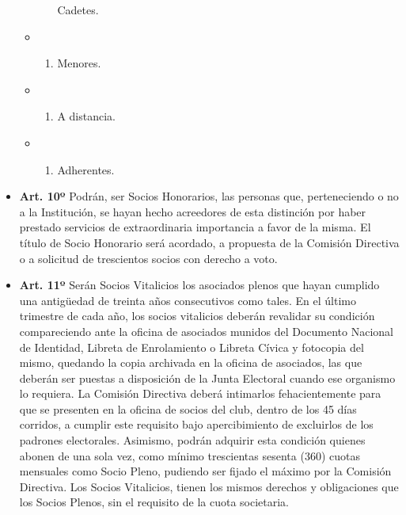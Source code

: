 \documentclass[]{book}
\providecommand{\tightlist}{%
  \setlength{\itemsep}{0pt}\setlength{\parskip}{0pt}}
\begin{document}
\begin{itemize}
\begin{itemize}
\begin{enumerate}
      Cadetes.
    \end{enumerate}
  \item
    \begin{enumerate}
    \def\labelenumi{\alph{enumi})}
    \setcounter{enumi}{6}
    \tightlist
    \item
      Menores.
    \end{enumerate}
  \item
    \begin{enumerate}
    \def\labelenumi{\alph{enumi})}
    \setcounter{enumi}{7}
    \tightlist
    \item
      A distancia.
    \end{enumerate}
  \item
    \begin{enumerate}
    \def\labelenumi{\roman{enumi})}
    \tightlist
    \item
      Adherentes.
    \end{enumerate}
  \end{itemize}
\item
  \textbf{Art. 10º} Podrán, ser Socios Honorarios, las personas que,
  perteneciendo o no a la Institución, se hayan hecho acreedores de esta
  distinción por haber prestado servicios de extraordinaria importancia
  a favor de la misma. El título de Socio Honorario será acordado, a
  propuesta de la Comisión Directiva o a solicitud de trescientos socios
  con derecho a voto.
\item
  \textbf{Art. 11º} Serán Socios Vitalicios los asociados plenos que
  hayan cumplido una antigüedad de treinta años consecutivos como tales.
  En el último trimestre de cada año, los socios vitalicios deberán
  revalidar su condición compareciendo ante la oficina de asociados
  munidos del Documento Nacional de Identidad, Libreta de Enrolamiento o
  Libreta Cívica y fotocopia del mismo, quedando la copia archivada en
  la oficina de asociados, las que deberán ser puestas a disposición de
  la Junta Electoral cuando ese organismo lo requiera. La Comisión
  Directiva deberá intimarlos fehacientemente para que se presenten en
  la oficina de socios del club, dentro de los 45 días corridos, a
  cumplir este requisito bajo apercibimiento de excluirlos de los
  padrones electorales. Asimismo, podrán adquirir esta condición quienes
  abonen de una sola vez, como mínimo trescientas sesenta (360) cuotas
  mensuales como Socio Pleno, pudiendo ser fijado el máximo por la
  Comisión Directiva. Los Socios Vitalicios, tienen los mismos derechos
  y obligaciones que los Socios Plenos, sin el requisito de la cuota
  societaria.
\end{itemize}
\end{document}
